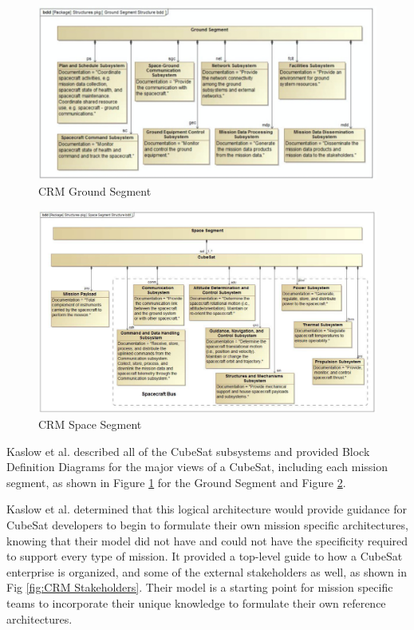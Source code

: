 \begin{figure}
    \centering
    \includegraphics[width=\textwidth]{Thesis/Literature_Review/Lit Review Figures/CubeSat Ground Segment.png}
    \caption{CRM Ground Segment}
    \label{fig:CRM Ground Segment}
\end{figure}

\begin{figure}
    \centering
    \includegraphics[width=\textwidth]{Thesis/Literature_Review/Lit Review Figures/CubeSat RA Space Segment.png}
    \caption{CRM Space Segment}
    \label{fig:CRM Space Segment}
\end{figure}


Kaslow et al. described all of the CubeSat subsystems and provided Block Definition Diagrams for the major views of a CubeSat, including each mission segment, as shown in Figure \ref{fig:CRM Ground Segment} for the Ground Segment and Figure \ref{fig:CRM Space Segment}.

Kaslow et al. determined that this logical architecture would provide guidance for CubeSat developers to begin to formulate their own mission specific architectures, knowing that their model did not have and could not have the specificity required to support every type of mission. It provided a top-level guide to how a CubeSat enterprise is organized, and some of the external stakeholders as well, as shown in Fig \ref{fig:CRM Stakeholders}. Their model is a starting point for mission specific teams to incorporate their unique knowledge to formulate their own reference architectures.

